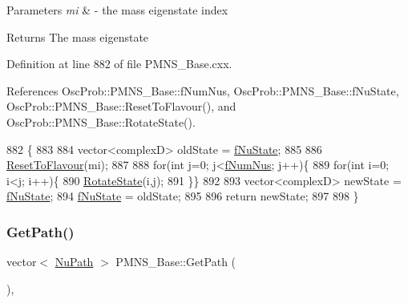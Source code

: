 \begin{DoxyParams}{Parameters}
{\em mi} & -\/ the mass eigenstate index\\
\hline
\end{DoxyParams}
\begin{DoxyReturn}{Returns}
The mass eigenstate 
\end{DoxyReturn}


Definition at line 882 of file P\+M\+N\+S\+\_\+\+Base.\+cxx.



References Osc\+Prob\+::\+P\+M\+N\+S\+\_\+\+Base\+::f\+Num\+Nus, Osc\+Prob\+::\+P\+M\+N\+S\+\_\+\+Base\+::f\+Nu\+State, Osc\+Prob\+::\+P\+M\+N\+S\+\_\+\+Base\+::\+Reset\+To\+Flavour(), and Osc\+Prob\+::\+P\+M\+N\+S\+\_\+\+Base\+::\+Rotate\+State().


\begin{DoxyCode}
882                                                       \{
883 
884   vector<complexD> oldState = \hyperlink{classOscProb_1_1PMNS__Base_abf99f2339e3ee989600740b5d88063e8}{fNuState};
885 
886   \hyperlink{classOscProb_1_1PMNS__Base_ac0d4bf8ff1318ef96d3dafa62e0cec25}{ResetToFlavour}(mi);
887   
888   \textcolor{keywordflow}{for}(\textcolor{keywordtype}{int} j=0; j<\hyperlink{classOscProb_1_1PMNS__Base_a24bb74bed63569dfe88b18fa6a08060e}{fNumNus}; j++)\{
889   \textcolor{keywordflow}{for}(\textcolor{keywordtype}{int} i=0; i<j; i++)\{
890     \hyperlink{classOscProb_1_1PMNS__Base_ae52554477ad3250daa5adb8c32cab0b4}{RotateState}(i,j);
891   \}\}
892 
893   vector<complexD> newState = \hyperlink{classOscProb_1_1PMNS__Base_abf99f2339e3ee989600740b5d88063e8}{fNuState};
894   \hyperlink{classOscProb_1_1PMNS__Base_abf99f2339e3ee989600740b5d88063e8}{fNuState} = oldState;
895   
896   \textcolor{keywordflow}{return} newState;
897   
898 \}
\end{DoxyCode}
\mbox{\label{classOscProb_1_1PMNS__Base_ac8e196f2e85a2b1caaf705073ee95a5c}} 
\subsubsection{\texorpdfstring{Get\+Path()}{GetPath()}}
{\footnotesize\ttfamily vector$<$ \hyperlink{structOscProb_1_1NuPath}{Nu\+Path} $>$ P\+M\+N\+S\+\_\+\+Base\+::\+Get\+Path (\begin{DoxyParamCaption}{ }\end{DoxyParamCaption})\hspace{0.3cm}{\ttfamily [virtual]}, {\ttfamily [inherited]}}

